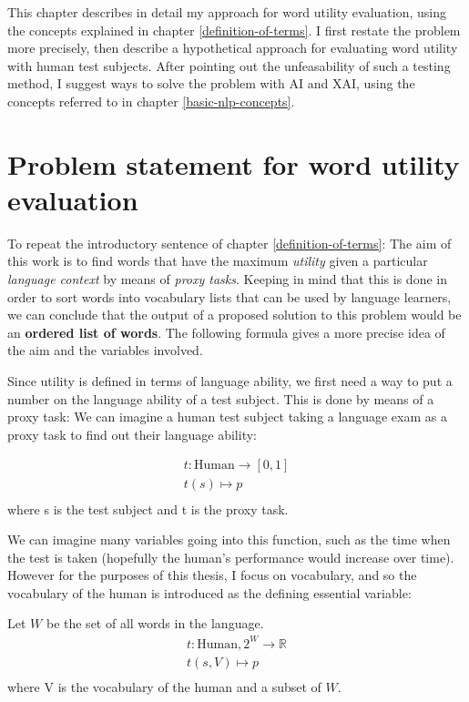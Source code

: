 This chapter describes in detail my approach for word utility evaluation, using the concepts explained in chapter \ref{definition-of-terms}.
I first restate the problem more precisely, then describe a hypothetical approach for evaluating word utility with human test subjects. After pointing out the unfeasability of such a testing method, I suggest ways to solve the problem with AI and XAI, using the concepts referred to in chapter \ref{basic-nlp-concepts}.

\section{Problem statement for word utility evaluation}


To repeat the introductory sentence of chapter \ref{definition-of-terms}:
The aim of this work is to find words that have the maximum \textit{utility} given a particular \textit{language context} by means of \textit{proxy tasks}.
Keeping in mind that this is done in order to sort words into vocabulary lists that can be used by language learners, we can conclude that the output of a proposed solution to this problem would be an \textbf{ordered list of words}. The following formula gives a more precise idea of the aim and the variables involved.

Since utility is defined in terms of language ability, we first need a way to put a number on the language ability of a test subject. This is done by means of a proxy task: We can imagine a human test subject taking a language exam as a proxy task to find out their language ability:

\begin{align*}
	t: \text{Human} \to [0, 1] \\
	t (s) \mapsto p                 \\
\end{align*}
where s is the test subject and t is the proxy task.

We can imagine many variables going into this function, such as the time when the test is taken (hopefully the human's performance would increase over time). However for the purposes of this thesis, I focus on vocabulary, and so the vocabulary of the human is introduced as the defining essential variable:

Let $W$ be the set of all words in the language.
\begin{align*}
	t: \text{Human}, 2^{W}\to \mathbb{R} \\
	t (s, V) \mapsto p                    \\
\end{align*}
where V is the vocabulary of the human and a subset of $W$.

